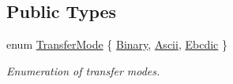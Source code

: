\subsection*{Public Types}
\begin{DoxyCompactItemize}
\item 
enum \mbox{\hyperlink{classsf_1_1_ftp_a1cd6b89ad23253f6d97e6d4ca4d558cb}{Transfer\+Mode}} \{ \mbox{\hyperlink{classsf_1_1_ftp_a1cd6b89ad23253f6d97e6d4ca4d558cba6f253b362639fb5e059dc292762a21ee}{Binary}}, 
\mbox{\hyperlink{classsf_1_1_ftp_a1cd6b89ad23253f6d97e6d4ca4d558cbac9e544a22dce8ef3177449cb235d15c2}{Ascii}}, 
\mbox{\hyperlink{classsf_1_1_ftp_a1cd6b89ad23253f6d97e6d4ca4d558cbabb1e34435231e73c96534c71090be7f4}{Ebcdic}}
 \}
\begin{DoxyCompactList}\small\item\em Enumeration of transfer modes. \end{DoxyCompactList}\end{DoxyCompactItemize}
